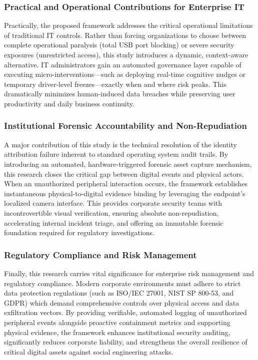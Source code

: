 \documentclass{ieeeaccess}
\begin{document}
\subsubsection{Practical and Operational Contributions for Enterprise IT}
Practically, the proposed framework addresses the critical operational limitations of traditional IT controls. Rather than forcing organizations to choose between complete operational paralysis (total USB port blocking) or severe security exposures (unrestricted access), this study introduces a dynamic, context-aware alternative. IT administrators gain an automated governance layer capable of executing micro-interventions—such as deploying real-time cognitive nudges or temporary driver-level freezes—exactly when and where risk peaks. This dramatically minimizes human-induced data breaches while preserving user productivity and daily business continuity.

\subsubsection{Institutional Forensic Accountability and Non-Repudiation}
A major contribution of this study is the technical resolution of the identity attribution failure inherent to standard operating system audit trails. By introducing an automated, hardware-triggered forensic asset capture mechanism, this research closes the critical gap between digital events and physical actors. When an unauthorized peripheral interaction occurs, the framework establishes instantaneous physical-to-digital evidence binding by leveraging the endpoint's localized camera interface. This provides corporate security teams with incontrovertible visual verification, ensuring absolute non-repudiation, accelerating internal incident triage, and offering an immutable forensic foundation required for regulatory investigations.

\subsubsection{Regulatory Compliance and Risk Management}
Finally, this research carries vital significance for enterprise risk management and regulatory compliance. Modern corporate environments must adhere to strict data protection regulations (such as ISO/IEC 27001, NIST SP 800-53, and GDPR) which demand comprehensive controls over physical access and data exfiltration vectors. By providing verifiable, automated logging of unauthorized peripheral events alongside proactive containment metrics and supporting physical evidence, the framework enhances institutional security auditing, significantly reduces corporate liability, and strengthens the overall resilience of critical digital assets against social engineering attacks.
\end{document}

